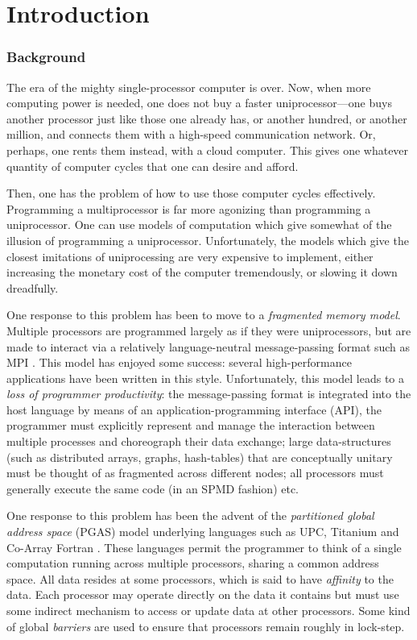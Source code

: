 \chapter{Introduction}

\subsection*{Background}



The era of the mighty single-processor computer is over. Now, when more
computing power is needed, one does not buy a faster uniprocessor---one buys
another processor just like those one already has, or another hundred, or
another million, and connects them with a high-speed communication network.
Or, perhaps, one rents them instead, with a cloud computer. This gives one
whatever quantity of computer cycles that one can desire and afford.

Then, one has the problem of how to use those computer cycles effectively.
Programming a multiprocessor is far more agonizing than programming a
uniprocessor.   One can use models of computation which give somewhat of the
illusion of programming a uniprocessor.  Unfortunately, the models which give
the closest imitations of uniprocessing are very expensive to implement,
either increasing the monetary cost of the computer tremendously, or slowing
it down dreadfully. 

One response to this problem has been to move to a {\em fragmented memory
  model}. Multiple processors are programmed largely as if they were
uniprocessors, but are made to interact via a relatively language-neutral
message-passing format such as MPI \cite{mpi}. This model has enjoyed some
success: several high-performance applications have been written in this
style. Unfortunately, this model leads to a {\em loss of programmer
  productivity}: the message-passing format is integrated into the host
language by means of an application-programming interface (API), the
programmer must explicitly represent and manage the interaction between
multiple processes and choreograph their data exchange; large data-structures
(such as distributed arrays, graphs, hash-tables) that are conceptually
unitary must be thought of as fragmented across different nodes; all
processors must generally execute the same code (in an SPMD fashion) etc.

One response to this problem has been the advent of the {\em
partitioned global address space} (PGAS) model underlying languages
such as UPC, Titanium and Co-Array Fortran \cite{pgas,titanium}. These
languages permit the programmer to think of a single computation
running across multiple processors, sharing a common address
space. All data resides at some processors, which is said to have {\em
affinity} to the data.  Each processor may operate directly on the
data it contains but must use some indirect mechanism to access or
update data at other processors. Some kind of global {\em barriers}
are used to ensure that processors remain roughly in lock-step.

